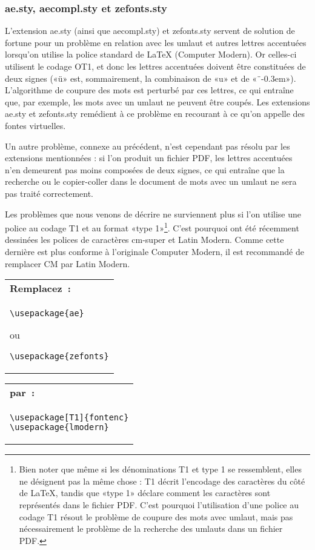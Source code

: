 \documentclass[fontsize=11pt, paper=a4, pagesize, captions=tableheading, numbers=enddot, toc=graduated, footnotes=multiple]{scrartcl}%
\makeatletter
\newcommand{\Paket}[1]{\textsf{#1.sty}\xspace}
\newcommand{\PakeH}[1]{#1.sty\xspace}
\newenvironment{Ers}[1][\linewidth]{%
  \par\bigskip\noindent\marginline{\textcolor{gruen}{\boldmath $\triangleright$}}\begin{tabular}[t]{@{}p{0.5\textwidth}@{}}\textcolor{rot}{\textbf{\textsf{Remplacez~:}}%
}\\[2pt] \rahmenpr[#1]}%
{\endrahmenpr\end{tabular}}
\newenvironment{Dur}[1][0.5\textwidth]{%
\noindent\begin{tabular}[t]{@{}p{0.5\textwidth - 0.5em}@{}}\textcolor{gruen}{\textbf{\textsf{par~:}}}\\[2pt]\rahmenpg[#1]}%
{\endrahmenpg\end{tabular}\smallskip\noindent}
\makeatother
\begin{document}
\subsubsection{\PakeH{ae}, \PakeH{aecompl} et \PakeH{zefonts}}
\label{sec:ae}
L’extension \Paket{ae} (ainsi que \Paket{aecompl}) et \Paket{zefonts}servent de solution de fortune pour un problème en relation avec les umlaut et autres lettres accentuées lorsqu’on utilise la police standard de \LaTeX{} (Computer Modern). Or celles-ci utilisent le codage OT1, et donc les lettres accentuées doivent être constituées de deux signes («ü» est, sommairement, la combinaison de «u» et de «\"\ \kern-0.3em»). L’algorithme de coupure des mots est perturbé par ces lettres, ce qui entraîne que, par exemple, les mots avec un umlaut ne peuvent être coupés. Les extensions \Paket{ae} et \Paket{zefonts} remédient à ce problème en recourant à ce qu’on appelle des fontes virtuelles.

Un autre problème, connexe au précédent, n’est cependant pas résolu par les extensions mentionnées : si l’on produit un fichier PDF, les lettres accentuées n’en demeurent pas moins composées de deux signes, ce qui entraîne que la recherche ou le copier-coller dans le document de mots avec un umlaut ne sera pas traité correctement.

Les problèmes que nous venons de décrire ne surviennent plus si l’on utilise une police au codage T1 et au format «type 1»\footnote{Bien noter que même si les dénominations T1 et type 1 se ressemblent, elles ne désignent pas la même chose : T1 décrit l’encodage des caractères du côté de \LaTeX{}, tandis que «type 1» déclare comment les caractères sont représentés dans le fichier PDF. C’est pourquoi l’utilisation d’une police au codage T1 résout le problème de coupure des mots avec umlaut, mais pas nécessairement le problème de la recherche des umlauts dans un fichier PDF.}. C’est pourquoi ont été récemment dessinées les polices de caractères cm-super et Latin Modern. Comme cette dernière est plus conforme à l’originale Computer Modern, il est recommandé de remplacer CM par Latin Modern.

\begin{Ers}
\begin{verbatim}
\usepackage{ae}
\end{verbatim}
ou
\begin{verbatim}
\usepackage{zefonts}
\end{verbatim}
\end{Ers}
\begin{Dur}
\begin{verbatim}
\usepackage[T1]{fontenc}
\usepackage{lmodern}
\end{verbatim}
\end{Dur}
\end{document}
